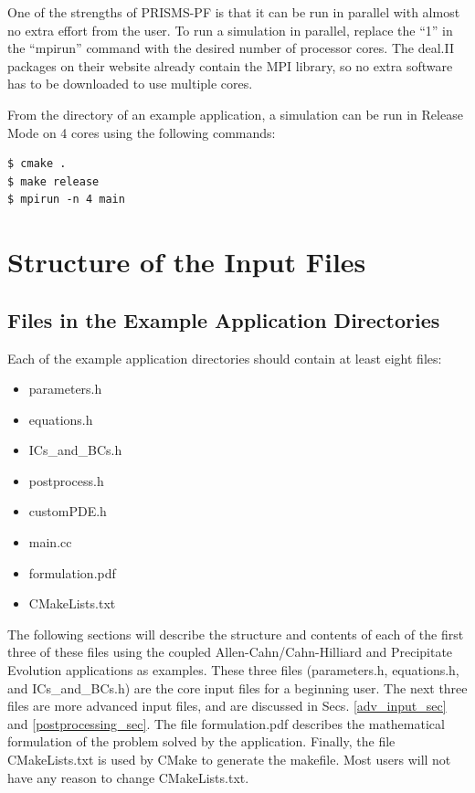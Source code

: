 \documentclass[10pt]{article} %
\begin{document}
One of the strengths of PRISMS-PF is that it can be run in parallel with almost no extra effort from the user. To run a simulation in parallel, replace the ``1'' in the ``mpirun'' command with the desired number of processor cores. The deal.II packages on their website already contain the MPI library, so no extra software has to be downloaded to use multiple cores.

From the directory of an example application, a simulation can be run in Release Mode on 4 cores using the following commands:
\begin{lstlisting}
$ cmake . 
$ make release
$ mpirun -n 4 main 
\end{lstlisting}

\section{Structure of the Input Files}
\subsection{Files in the Example Application Directories}
Each of the example application directories should contain at least eight files:
\begin{itemize}
\item parameters.h
\item equations.h
\item ICs\_and\_BCs.h
\item postprocess.h
\item customPDE.h
\item main.cc
\item formulation.pdf
\item CMakeLists.txt
\end{itemize}

The following sections will describe the structure and contents of each of the first three of these files using the coupled Allen-Cahn/Cahn-Hilliard and Precipitate Evolution applications as examples. These three files (parameters.h, equations.h, and ICs\_and\_BCs.h) are the core input files for a beginning user. The next three files are more advanced input files, and are discussed in Secs. \ref{adv_input_sec} and \ref{postprocessing_sec}. The file formulation.pdf describes the mathematical formulation of the problem solved by the application. Finally, the file CMakeLists.txt is used by CMake to generate the makefile. Most users will not have any reason to change CMakeLists.txt.
\end{document}
